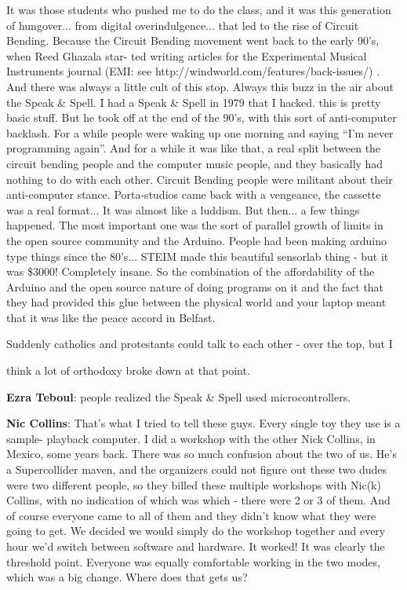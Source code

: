 It was those students who pushed me to do the class, and it was this generation of hungover... from digital overindulgence... that led to the rise of Circuit Bending. Because the Circuit Bending movement went back to the early 90’s, when Reed Ghazala star- ted writing articles for the Experimental Musical Instruments journal (EMI: see http://windworld.com/features/back-issues/) . And there was always a little cult of this stop. Always this buzz in the air about the Speak & Spell. I had a Speak & Spell in 1979 that I hacked. this is pretty basic stuff. But he took off at the end of the 90’s, with this sort of anti-computer backlash. For a while people were waking up one morning and saying ``I’m never programming again''. And for a while it was like that, a real split between the circuit bending people and the computer music people, and they basically had nothing to do with each other. Circuit Bending people were militant about their anti-computer stance. Porta-studios came back with a vengeance, the cassette was a real format... It was almost like a luddism. But then... a few things happened. The most important one was the sort of parallel growth of limits in the open source community and the Arduino.   People had been making arduino type things since the 80’s... STEIM made this beautiful sensorlab thing - but it was \$3000! Completely insane. So the combination of the affordability of the Arduino and the open source nature of doing programs on it and the fact that they had provided this glue between the physical world and your laptop meant that it was like the peace accord in Belfast.
				

Suddenly catholics and protestants could talk to each other - over the top, but I
					
think a lot of orthodoxy broke down at that point.
					
\textbf{Ezra Teboul}: people realized the Speak & Spell used microcontrollers.
					
\textbf{Nic Collins}: That’s what I tried to tell these guys. Every single toy they use is a sample- playback computer. I did a workshop with the other Nick Collins, in Mexico, some years back. There was so much confusion about the two of us. He’s a Supercollider maven, and the organizers could not figure out these two dudes were two different people, so they billed these multiple workshops with Nic(k) Collins, with no indication of which was which - there were 2 or 3 of them. And of course everyone came to all of them and they didn’t know what they were going to get. We decided we would simply do the workshop together and every hour we’d switch between software and hardware. It worked! It was clearly the threshold point. Everyone was equally comfortable working in the two modes, which was a big change. Where does that gets us?
					
